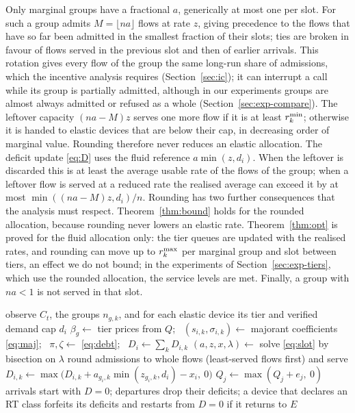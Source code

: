 Only marginal groups have a fractional $a$, generically at most one per slot.
For such a group \repay{} admits $M=\lfloor n a\rfloor$ flows at rate $z$, giving precedence to the flows that have so far been admitted in the smallest fraction of their slots; ties are broken in favour of flows served in the previous slot and then of earlier arrivals.
This rotation gives every flow of the group the same long-run share of admissions, which the incentive analysis requires (Section~\ref{sec:ic}); it can interrupt a call while its group is partially admitted, although in our experiments groups are almost always admitted or refused as a whole (Section~\ref{sec:exp-compare}).
The leftover capacity $(na-M)z$ serves one more flow if it is at least $r^{\min}_k$; otherwise it is handed to elastic devices that are below their cap, in decreasing order of marginal value.
Rounding therefore never reduces an elastic allocation.
The deficit update \eqref{eq:D} uses the fluid reference $a\min(z,d_i)$. When the leftover is discarded this is at least the average usable rate of the flows of the group; when a leftover flow is served at a reduced rate the realised average can exceed it by at most $\min((na-M)z,d_i)/n$.
Rounding has two further consequences that the analysis must respect. Theorem~\ref{thm:bound} holds for the rounded allocation, because rounding never lowers an elastic rate. Theorem~\ref{thm:opt} is proved for the fluid allocation only: the tier queues are updated with the realised rates, and rounding can move up to $r^{\max}_k$ per marginal group and slot between tiers, an effect we do not bound; in the experiments of Section~\ref{sec:exp-tiers}, which use the rounded allocation, the service levels are met. Finally, a group with $na<1$ is not served in that slot.

\begin{algorithm}[t]
\caption{\repay{}, slot $t$}\label{alg:repay}
\begin{algorithmic}[1]
\State observe $C_t$, the groups $n_{g,k}$, and for each elastic device its tier and verified demand cap $d_i$
\State $\beta_g\gets$ tier prices from $Q$; \ $(s_{i,k},\sigma_{i,k})\gets$ majorant coefficients \eqref{eq:maj}; \ $\pi,\zeta\gets$ \eqref{eq:debt}; \ $D_i\gets\sum_kD_{i,k}$
\State $(a,z,x,\lambda)\gets$ solve \eqref{eq:slot} by bisection on $\lambda$
\State round admissions to whole flows (least-served flows first) and serve
 $D_{i,k}\gets\max\big(D_{i,k}+a_{g_i,k}\min(z_{g_i,k},d_i)-x_i,\ 0\big)$ \EndFor
{} $Q_j\gets\max(Q_j+e_j,\ 0)$ \EndFor
\State arrivals start with $D=0$; departures drop their deficits; a device that declares an RT class forfeits its deficits and restarts from $D=0$ if it returns to $E$
\end{algorithmic}
\end{algorithm}

